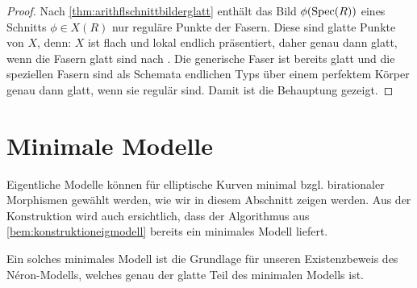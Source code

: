 \documentclass[german, bibliography=totoc]{scrreprt}
\begin{document}
\begin{Korollar}
\begin{proof}
    Nach \ref{thm:arithflschnittbilderglatt} enthält das Bild
    $\phi(\operatorname{Spec}(R))$ eines Schnitts $\phi\in X(R)$ nur reguläre
    Punkte der Fasern. Diese sind glatte Punkte von $X$, denn:
    $X$ ist flach und lokal endlich präsentiert, daher genau dann
    glatt, wenn die Fasern glatt sind nach
    \cite[8.5, Proposition 17]{bosch}.
    Die generische Faser ist bereits glatt und die speziellen Fasern
    sind als Schemata endlichen Typs über einem perfektem Körper
    genau dann glatt, wenn sie regulär sind.
    Damit ist die Behauptung gezeigt.
  \end{proof}
\end{Korollar}


\section{Minimale Modelle}\label{chap:minmodelle}
Eigentliche Modelle können für elliptische Kurven minimal
bzgl. birationaler Morphismen gewählt werden, wie wir in diesem
Abschnitt zeigen werden. Aus der Konstruktion wird auch ersichtlich,
dass der Algorithmus aus \ref{bem:konstruktioneigmodell} bereits ein
minimales Modell liefert.

Ein solches minimales Modell ist die Grundlage für unseren
Existenzbeweis des Néron-Modells, welches genau der glatte Teil des
minimalen Modells ist.
\end{document}
